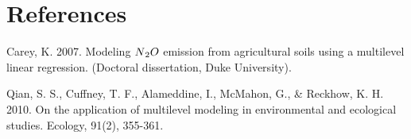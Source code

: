 \documentclass[12pt, oneside]{article}
\begin{document}
\section*{References}
\begin{hangparas}{.25in}{1} 
Carey, K. 2007. Modeling $N\textsubscript{2}O$ emission from agricultural soils using a multilevel linear regression. (Doctoral dissertation, Duke University).

\vspace{.5cm}
Qian, S. S., Cuffney, T.  F., Alameddine, I., McMahon, G., \& Reckhow, K. H. 2010. On the application of multilevel modeling in environmental and ecological studies. Ecology, 91(2), 355-361. 
\end{hangparas} 
\end{document}
